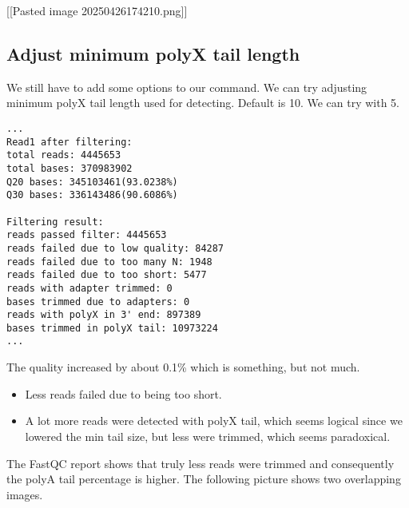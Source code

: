 {[}{[}Pasted image 20250426174210.png{]}{]}

\hypertarget{adjust-minimum-polyx-tail-length}{%
\subsection{Adjust minimum polyX tail
length}\label{adjust-minimum-polyx-tail-length}}

We still have to add some options to our command. We can try adjusting
minimum polyX tail length used for detecting. Default is 10. We can try
with 5.

\begin{Shaded}
\begin{Highlighting}[]
\end{Highlighting}
\end{Shaded}

\begin{verbatim}
...
Read1 after filtering:
total reads: 4445653
total bases: 370983902
Q20 bases: 345103461(93.0238%)
Q30 bases: 336143486(90.6086%)

Filtering result:
reads passed filter: 4445653
reads failed due to low quality: 84287
reads failed due to too many N: 1948
reads failed due to too short: 5477
reads with adapter trimmed: 0
bases trimmed due to adapters: 0
reads with polyX in 3' end: 897389
bases trimmed in polyX tail: 10973224
...
\end{verbatim}

The quality increased by about 0.1\% which is something, but not much.

\begin{itemize}
\tightlist
\item
  Less reads failed due to being too short.
\item
  A lot more reads were detected with polyX tail, which seems logical
  since we lowered the min tail size, but less were trimmed, which seems
  paradoxical.
\end{itemize}

The FastQC report shows that truly less reads were trimmed and
consequently the polyA tail percentage is higher. The following picture
shows two overlapping images.

